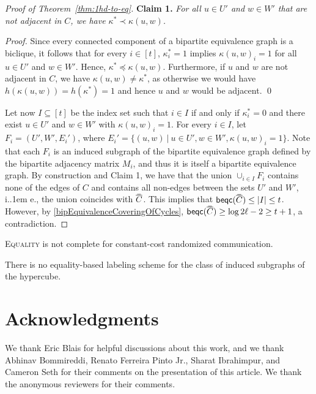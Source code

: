 \documentclass{theoretics}
\makeatletter
\newcommand{\beqc}{\mathsf{beqc}}
\newcommand*\ie{i.\kern.1em e.\@\xspace} %
\newcommand\doverline[1]{%
  \setbox0=\hbox{$\!\overline{#1}\!$}%
  \ht0=\dimexpr\ht0-.2ex\relax%
  \,\overline{\copy0}\,%
}
\newcommand{\bc}[1]{\doverline{#1}} %
\makeatother
\begin{document}
\begin{proof}[Proof of Theorem~\ref{thm:1hd-to-eq}]
	\medskip
	\noindent	
	\textbf{Claim 1.} \emph{For all $u \in U'$ and $w \in W'$ that are \emph{not} adjacent in $C$, we have $\kappa^* \prec \kappa(u,w)$.}
		
	\smallskip
	\noindent
	\emph{Proof.} 
	Since every connected component of a bipartite equivalence graph is a biclique,
	it follows that for every $i \in [t]$, 
	$\kappa^*_i = 1$ implies $\kappa(u,w)_i = 1$ for all $u \in U'$ and $w \in W'$.
	Hence, $\kappa^* \preceq \kappa(u,w)$.
	Furthermore, if $u$ and $w$ are not adjacent in $C$,
	we have $\kappa(u,w) \neq \kappa^*$, as otherwise we would have $h(\kappa(u,w)) = h(\kappa^*) = 1$ and hence $u$ and $w$ would be adjacent. \qed
	
	\medskip
	\noindent
	Let now $I \subseteq [t]$ be the index set such that $i \in I$ if and only if 
	$\kappa^*_i = 0$ and there exist $u \in U'$ and $w \in W'$ with $\kappa(u,w)_i = 1$. 
	For every $i \in I$, let $F_i = (U',W', E_i')$, where
	$E_i' = \{ (u,w) ~|~ u \in U', w \in W', \kappa(u,w)_i = 1\}$. 
	Note that each $F_i$ is an induced subgraph of the bipartite equivalence graph defined by the bipartite adjacency matrix $M_i$, and thus it is itself a bipartite equivalence graph.
	By construction and Claim 1, we have that the union $\cup_{i \in I} F_i$
	contains none of the edges of $C$ and contains all non-edges between the sets $U'$ and $W'$, \ie,
	the union coincides with $\bc{C}$. This implies that $\beqc(\bc{C}) \leq |I| \leq t$. However, by \cref{bipEquivalenceCoveringOfCycles}, $\beqc(\bc{C}) \geq \log 2\ell - 2 \geq t+1$, a contradiction.
\end{proof}


\begin{corollary}
\textsc{Equality} is not complete for constant-cost randomized communication.
\end{corollary}

\begin{corollary}
There is no equality-based labeling scheme for the class of induced subgraphs of the hypercube.
\end{corollary}




\section*{Acknowledgments} 

We thank Eric Blais for helpful discussions about this work, and we thank Abhinav Bommireddi, Renato
Ferreira Pinto Jr., Sharat Ibrahimpur, and Cameron Seth for their comments on the presentation of
this article. We thank the anonymous reviewers for their comments.
\end{document}
